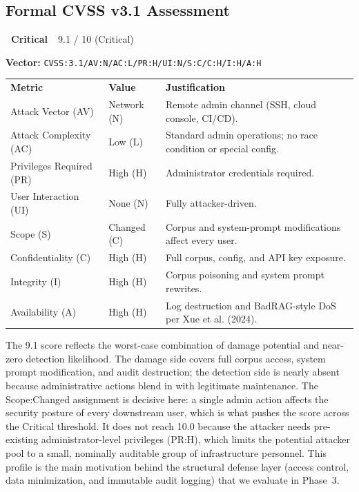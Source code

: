 \documentclass[12pt, a4paper]{report}
\newcommand{\badgecritical}{\colorbox{danger}{\color{white}\small\textbf{~Critical~}}}
\newcommand{\cvssvec}[1]{\texttt{\small #1}}
\begin{document}
\subsection{Formal CVSS v3.1 Assessment}

\begin{cvssbox}{\badgecritical\ 9.1 / 10 (Critical)}
\vspace{2pt}
\begin{center}
\textbf{Vector:}\enspace
\cvssvec{CVSS:3.1/AV:N/AC:L/PR:H/UI:N/S:C/C:H/I:H/A:H}
\end{center}
\vspace{8pt}
\begin{tabular}{L{3.4cm} L{2.2cm} L{7.8cm}}
  \color{white}\small\textbf{Metric} &
  \color{white}\small\textbf{Value} &
  \color{white}\small\textbf{Justification} \\
  \small Attack Vector (AV)     & \small Network (N) & \small Remote admin channel (SSH, cloud console, CI/CD). \\
  \small Attack Complexity (AC) & \small Low (L)     & \small Standard admin operations; no race condition or special config. \\
  \small Privileges Required (PR)  & \small High (H) & \small Administrator credentials required. \\
  \small User Interaction (UI)  & \small None (N)    & \small Fully attacker-driven. \\
  \small Scope (S)              & \small Changed (C) & \small Corpus and system-prompt modifications affect every user. \\
  \small Confidentiality (C)    & \small High (H)    & \small Full corpus, config, and API key exposure. \\
  \small Integrity (I)          & \small High (H)    & \small Corpus poisoning and system prompt rewrites. \\
  \small Availability (A)       & \small High (H)    & \small Log destruction and BadRAG-style DoS per Xue et al. (2024). \\
\end{tabular}
\vspace{6pt}

\small The 9.1 score reflects the worst-case combination of damage
potential and near-zero detection likelihood. The damage side covers
full corpus access, system prompt modification, and audit destruction;
the detection side is nearly absent because administrative actions
blend in with legitimate maintenance. The Scope:Changed assignment is
decisive here: a single admin action affects the security posture of
every downstream user, which is what pushes the score across the
Critical threshold. It does not reach 10.0 because the attacker needs
pre-existing administrator-level privileges (PR:H), which limits the
potential attacker pool to a small, nominally auditable group of
infrastructure personnel. This profile is the main motivation behind
the structural defense layer (access control, data minimization, and
immutable audit logging) that we evaluate in Phase~3.
\end{cvssbox}
\end{document}
